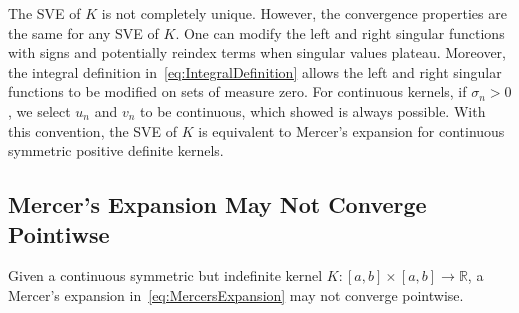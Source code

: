 \documentclass{article}
\begin{document}
The SVE of $K$ is not completely unique. However, the convergence properties are the same for any SVE of $K$. One can modify the left and right singular functions with signs and potentially reindex terms when singular values plateau. Moreover, the integral definition in~\cref{eq:IntegralDefinition} allows the left and right singular functions to be modified on sets of measure zero. For continuous kernels, if $\sigma_n>0$, we select $u_n$ and $v_n$ to be continuous, which \citet{schmidt1907theorie} showed is always possible. With this convention, the SVE of $K$ is equivalent to Mercer's expansion for continuous symmetric positive definite kernels. 

\subsection{Mercer's Expansion May Not Converge Pointiwse}\label{sec:examples}

Given a continuous symmetric but indefinite kernel $K : [a,b]\times [a,b]\rightarrow \mathbb{R}$, a Mercer's expansion in~\cref{eq:MercersExpansion} may not converge pointwise. 
\end{document}
